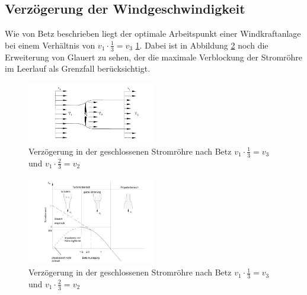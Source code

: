 \subsection{Verzögerung der Windgeschwindigkeit}
Wie von Betz beschrieben liegt der optimale Arbeitspunkt einer Windkraftanlage bei einem Verhältnis von $v_{1} \cdot \frac{1}{3}=v_{3}$  \ref{fig:Betz2905}. Dabei ist in Abbildung \ref{fig:Glauert} noch die Erweiterung von Glauert zu sehen, der die maximale Verblockung der Stromröhre im Leerlauf als Grenzfall berücksichtigt.
\begin{figure}[h!]
    \centering
    \includegraphics[width=0.5\textwidth]{Abbildungen/Betz.jpg}
    \caption{Verzögerung in der geschlossenen Stromröhre nach Betz $v_{1} \cdot \frac{1}{3}=v_{3}$ und  $v_{1} \cdot \frac{2}{3}=v_{2} $ \cite{Anleitung}}
    \label{fig:Betz2905}
\end{figure}
\begin{figure}[h!]
    \centering
    \includegraphics[width=0.5\textwidth]{Abbildungen/Glauert.jpg}
    \caption{Verzögerung in der geschlossenen Stromröhre nach Betz $v_{1} \cdot \frac{1}{3}=v_{3}$ und  $v_{1} \cdot \frac{2}{3}=v_{2} $\cite{Anleitung}}
    \label{fig:Glauert}
\end{figure}
